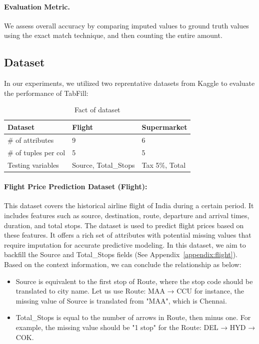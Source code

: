 \documentclass[sigconf]{acmart}
\begin{document}
\paragraph{Evaluation Metric.}
We assess overall accuracy by comparing imputed values to ground truth values using the exact match technique, and then counting the entire amount.

\subsection{Dataset}
In our experiments, we utilized two reprentative datasets from Kaggle to evaluate the performance of TabFill:

\begin{table}[h]
  \caption{Fact of dataset}
  \label{tab:dataset}
  \begin{tabular}{@{}lll@{}}
    \toprule
    Dataset              & Flight               & Supermarket    \\ \midrule
    \# of attributes     & 9                    & 6              \\
    \# of tuples per col & 5                    & 5              \\ 
    Testing variables      & Source, Total\_Stops & Tax 5\%, Total \\ \bottomrule
  \end{tabular}
\end{table}

\paragraph{Flight Price Prediction Dataset (Flight):} This dataset covers the historical airline flight of India during a certain period. It includes features such as source, destination, route, departure and arrival times, duration, and total stops. The dataset is used to predict flight prices based on these features. It offers a rich set of attributes with potential missing values that require imputation for accurate predictive modeling. In this dataset, we aim to backfill the Source and Total\_Stops fields (See Appendix~\ref{appendix:flight}). Based on the context information, we can conclude the relationship as below:
\begin{itemize}
  \item Source is equivalent to the first stop of Route, where the stop code should be translated to city name. Let us use Route: MAA → CCU for instance, the missing value of Source is translated from "MAA", which is Chennai.
  \item  Total\_Stops is equal to the number of arrows in Route, then minus one. For example, the missing value should be "1 stop" for the Route: DEL → HYD → COK.
\end{itemize}
\end{document}
